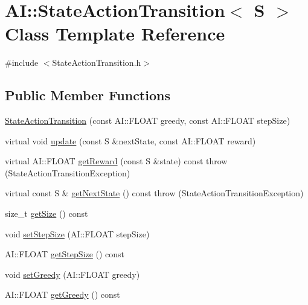 \hypertarget{classAI_1_1StateActionTransition}{\section{A\-I\-:\-:State\-Action\-Transition$<$ S $>$ Class Template Reference}
\label{classAI_1_1StateActionTransition}
}


{\ttfamily \#include $<$State\-Action\-Transition.\-h$>$}

\subsection*{Public Member Functions}
\begin{DoxyCompactItemize}
\item 
\hyperlink{classAI_1_1StateActionTransition_a7c70bec4af58688f1e85d7c7d9a3b019}{State\-Action\-Transition} (const A\-I\-::\-F\-L\-O\-A\-T greedy, const A\-I\-::\-F\-L\-O\-A\-T step\-Size)
\item 
virtual void \hyperlink{classAI_1_1StateActionTransition_aaf4a3e41cfbc11aa2b55a9c24ecc06ba}{update} (const S \&next\-State, const A\-I\-::\-F\-L\-O\-A\-T reward)
\item 
virtual A\-I\-::\-F\-L\-O\-A\-T \hyperlink{classAI_1_1StateActionTransition_aae9fe3f86d32f5ff131a57cffe51ce47}{get\-Reward} (const S \&state) const   throw (\-State\-Action\-Transition\-Exception)
\item 
virtual const S \& \hyperlink{classAI_1_1StateActionTransition_a05acc3ceeb885f9096a3a3462f83a0d5}{get\-Next\-State} () const   throw (\-State\-Action\-Transition\-Exception)
\item 
size\-\_\-t \hyperlink{classAI_1_1StateActionTransition_a3e518acacf20af127b9226bdb1ac887f}{get\-Size} () const 
\item 
void \hyperlink{classAI_1_1StateActionTransition_a150cdd5fc4b6ec63c31ec59008241ce2}{set\-Step\-Size} (A\-I\-::\-F\-L\-O\-A\-T step\-Size)
\item 
A\-I\-::\-F\-L\-O\-A\-T \hyperlink{classAI_1_1StateActionTransition_a8f785662b6b21607ca356dd3aa06f345}{get\-Step\-Size} () const 
\item 
void \hyperlink{classAI_1_1StateActionTransition_ac6b371a119dc22ecaa5cf53981c01317}{set\-Greedy} (A\-I\-::\-F\-L\-O\-A\-T greedy)
\item 
A\-I\-::\-F\-L\-O\-A\-T \hyperlink{classAI_1_1StateActionTransition_aec72b991f0d32d122b830d086a3615c0}{get\-Greedy} () const 
\end{DoxyCompactItemize}


